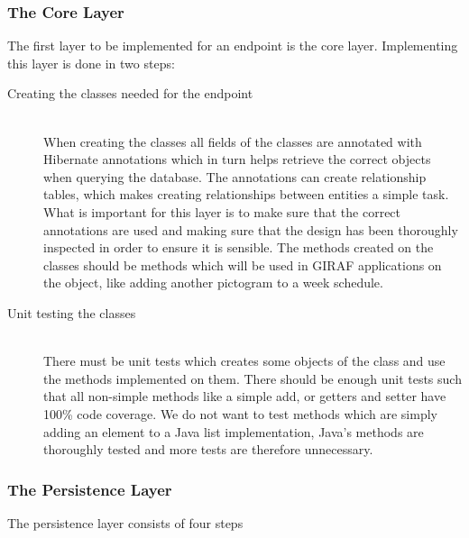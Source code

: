 \subsubsection{The Core Layer}
The first layer to be implemented for an endpoint is the core layer.
Implementing this layer is done in two steps:
\begin{description}
	\item[Creating the classes needed for the endpoint] \hfill \\
	When creating the classes all fields of the classes are annotated with Hibernate annotations which in turn helps retrieve the correct objects when querying the database.
	The annotations can create relationship tables, which makes creating relationships between entities a simple task.
	What is important for this layer is to make sure that the correct annotations are used and making sure that the design has been thoroughly inspected in order to ensure it is sensible.
	The methods created on the classes should be methods which will be used in GIRAF applications on the object, like adding another pictogram to a week schedule.
	\item[Unit testing the classes] \hfill \\
	There must be unit tests which creates some objects of the class and use the methods implemented on them.
	There should be enough unit tests such that all non-simple methods like a simple add, or getters and setter have 100\% code coverage.
	We do not want to test methods which are simply adding an element to a Java list implementation, Java's methods are thoroughly tested and more tests are therefore unnecessary. 
\end{description}

\noindent
\subsubsection{The Persistence Layer}
The persistence layer consists of four steps


